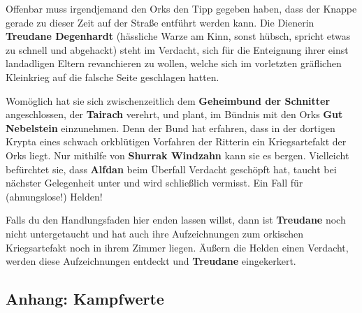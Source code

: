 

\label{ideen}

Offenbar muss irgendjemand den Orks den Tipp gegeben haben, dass der Knappe gerade zu dieser Zeit auf der Straße entführt werden kann.
Die Dienerin \textbf{Treudane Degenhardt} (hässliche Warze am Kinn, sonst hübsch, spricht etwas zu schnell und abgehackt) steht im Verdacht, 
sich für die Enteignung ihrer einst landadligen Eltern revanchieren zu wollen, welche sich im vorletzten gräflichen Kleinkrieg auf die falsche Seite geschlagen hatten.

Womöglich hat sie sich zwischenzeitlich dem \textbf{Geheimbund der Schnitter} angeschlossen, der \textbf{Tairach} verehrt, und plant, im Bündnis mit den Orks \textbf{Gut Nebelstein} einzunehmen.
Denn der Bund hat erfahren, dass in der dortigen Krypta eines schwach orkblütigen Vorfahren der Ritterin ein Kriegsartefakt der Orks liegt.
Nur mithilfe von \textbf{Shurrak Windzahn} kann sie es bergen. Vielleicht befürchtet sie, dass \textbf{Alfdan} beim Überfall Verdacht geschöpft hat, taucht bei nächster Gelegenheit unter und wird schließlich vermisst.
Ein Fall für (ahnungslose!) Helden!


Falls du den Handlungsfaden hier enden lassen willst, dann ist \textbf{Treudane} noch nicht untergetaucht und hat auch ihre Aufzeichnungen zum orkischen Kriegsartefakt noch in ihrem Zimmer liegen.
Äußern die Helden einen Verdacht, werden diese Aufzeichnungen entdeckt und \textbf{Treudane} eingekerkert.

\neueseite

\subsection{Anhang: Kampfwerte}

